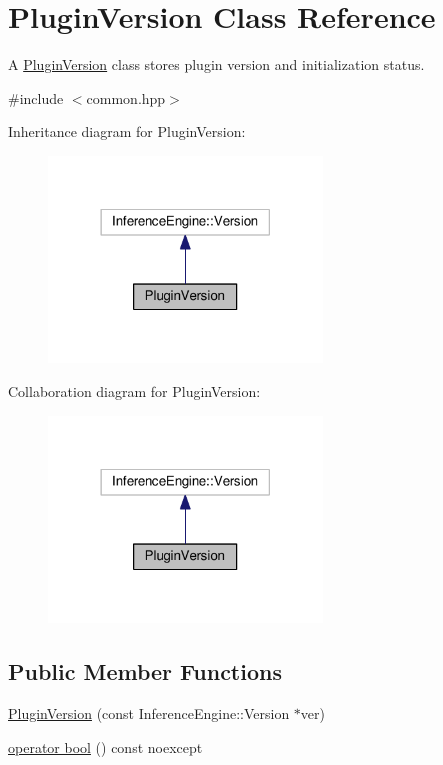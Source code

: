 \hypertarget{structPluginVersion}{}\section{Plugin\+Version Class Reference}
\label{structPluginVersion}


A \hyperlink{structPluginVersion}{Plugin\+Version} class stores plugin version and initialization status.  




{\ttfamily \#include $<$common.\+hpp$>$}



Inheritance diagram for Plugin\+Version\+:
\nopagebreak
\begin{figure}[H]
\begin{center}
\leavevmode
\includegraphics[width=206pt]{structPluginVersion__inherit__graph}
\end{center}
\end{figure}


Collaboration diagram for Plugin\+Version\+:
\nopagebreak
\begin{figure}[H]
\begin{center}
\leavevmode
\includegraphics[width=206pt]{structPluginVersion__coll__graph}
\end{center}
\end{figure}
\subsection*{Public Member Functions}
\begin{DoxyCompactItemize}
\item 
\hyperlink{structPluginVersion_a1c1350a01e77363446153a0ecfccf1f9}{Plugin\+Version} (const Inference\+Engine\+::\+Version $\ast$ver)
\item 
\hyperlink{structPluginVersion_a9dd75e7684175bd4a0cd47181292d052}{operator bool} () const noexcept
\end{DoxyCompactItemize}

